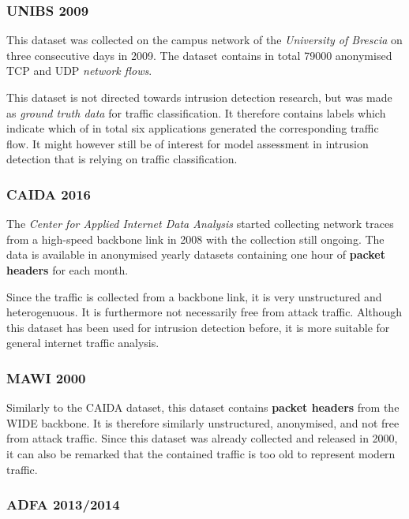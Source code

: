 \subsubsection*{UNIBS 2009\cite{UNIBS2009data}}

This dataset was collected on the campus network of the \textit{University of Brescia} on three consecutive days in 2009. The dataset contains in total 79000 anonymised TCP and UDP \textit{network flows}. 

This dataset is not directed towards intrusion detection research, but was made as \textit{ground truth data} for traffic classification. It therefore contains labels which indicate which of in total six applications generated the corresponding traffic flow. It might however still be of interest for model assessment in intrusion detection that is relying on traffic classification.

\subsubsection*{CAIDA 2016 \cite{walsworth2015caida}}

The \textit{Center for Applied Internet Data Analysis} started collecting network traces from a high-speed backbone link in 2008 with the collection still ongoing. The data is available in anonymised yearly datasets containing one hour of \textbf{packet headers} for each month. 

Since the traffic is collected from a backbone link, it is very unstructured and heterogenuous. It is furthermore not necessarily free from attack traffic. Although this dataset has been used for intrusion detection before, it is more suitable for general internet traffic analysis.


\subsubsection*{MAWI 2000 \cite{sony2000traffic}}

Similarly to the CAIDA dataset, this dataset contains \textbf{packet headers} from the WIDE backbone. It is therefore similarly unstructured, anonymised, and not free from attack traffic. Since this dataset was already collected and released in 2000, it can also be remarked that the contained traffic is too old to represent modern traffic. 

\subsubsection*{ADFA 2013/2014 \cite{creech2014developing,creech2013generation}}


